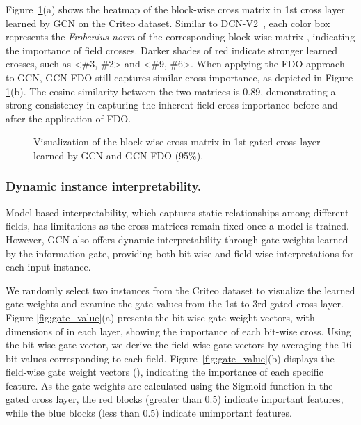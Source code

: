 \documentclass[sigconf]{acmart}
\begin{document}
Figure~\ref{fig:heatmap_cross}(a) shows the heatmap of the block-wise cross matrix  in 1st cross layer learned by GCN on the Criteo dataset. Similar to DCN-V2~\cite{wang2021dcnm}, each color box represents the \textit{Frobenius norm} of the corresponding block-wise matrix , indicating the importance of field crosses. Darker shades of red indicate stronger learned crosses, such as <\#3, \#2> and <\#9, \#6>. When applying the FDO approach to GCN, GCN-FDO still captures similar cross importance, as depicted in Figure \ref{fig:heatmap_cross}(b). The cosine similarity between the two matrices is 0.89, demonstrating a strong consistency in capturing the inherent field cross importance before and after the application of FDO. 



\begin{figure}[tb]
\setlength{\abovecaptionskip}{0.2cm}
\setlength{\belowcaptionskip}{-0.2cm}
\centering
{}

\centering
\caption{Visualization of the block-wise cross matrix  in 1st gated cross layer learned by GCN and GCN-FDO (95\%). } 
\label{fig:heatmap_cross}
\end{figure}

\subsubsection{Dynamic instance interpretability.}

Model-based interpretability, which captures static relationships among different fields, has limitations as the cross matrices remain fixed once a model is trained. However, GCN also offers dynamic interpretability through gate weights learned by the information gate, providing both bit-wise and field-wise interpretations for each input instance.

We randomly select two instances from the Criteo dataset to visualize the learned gate weights and examine the gate values from the 1st to 3rd gated cross layer. Figure \ref{fig:gate_value}(a) presents the bit-wise gate weight vectors, with dimensions of  in each layer, showing the importance of each bit-wise cross. Using the bit-wise gate vector, we derive the field-wise gate vectors by averaging the 16-bit values corresponding to each field. Figure~\ref{fig:gate_value}(b) displays the field-wise gate weight vectors (), indicating the importance of each specific feature. As the gate weights are calculated using the Sigmoid function in the gated cross layer, the red blocks (greater than 0.5) indicate important features, while the blue blocks (less than 0.5) indicate unimportant features.
\end{document}

